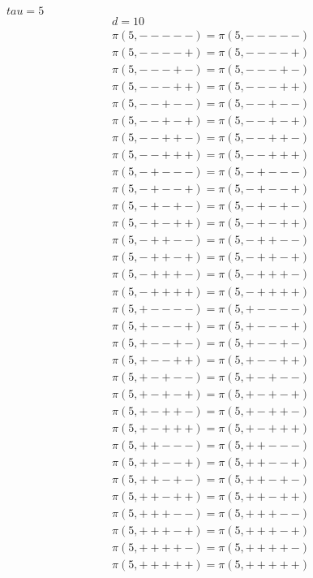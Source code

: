 \documentclass{article}
\begin{document}
	\pagebreak
			$ tau = 5$
		\begin{eqnarray*}
			d = 10\\
			\pi(5, -----) = \pi(5, -----)\\
			\pi(5, ----+) = \pi(5, ----+)\\
			\pi(5, ---+-) = \pi(5, ---+-)\\
			\pi(5, ---++) = \pi(5, ---++)\\
			\pi(5, --+--) = \pi(5, --+--)\\
			\pi(5, --+-+) = \pi(5, --+-+)\\
			\pi(5, --++-) = \pi(5, --++-)\\
			\pi(5, --+++) = \pi(5, --+++)\\
			\pi(5, -+---) = \pi(5, -+---)\\
			\pi(5, -+--+) = \pi(5, -+--+)\\
			\pi(5, -+-+-) = \pi(5, -+-+-)\\
			\pi(5, -+-++) = \pi(5, -+-++)\\
			\pi(5, -++--) = \pi(5, -++--)\\
			\pi(5, -++-+) = \pi(5, -++-+)\\
			\pi(5, -+++-) = \pi(5, -+++-)\\
			\pi(5, -++++) = \pi(5, -++++)\\
			\pi(5, +----) = \pi(5, +----)\\
			\pi(5, +---+) = \pi(5, +---+)\\
			\pi(5, +--+-) = \pi(5, +--+-)\\
			\pi(5, +--++) = \pi(5, +--++)\\
			\pi(5, +-+--) = \pi(5, +-+--)\\
			\pi(5, +-+-+) = \pi(5, +-+-+)\\
			\pi(5, +-++-) = \pi(5, +-++-)\\
			\pi(5, +-+++) = \pi(5, +-+++)\\
			\pi(5, ++---) = \pi(5, ++---)\\
			\pi(5, ++--+) = \pi(5, ++--+)\\
			\pi(5, ++-+-) = \pi(5, ++-+-)\\
			\pi(5, ++-++) = \pi(5, ++-++)\\
			\pi(5, +++--) = \pi(5, +++--)\\
			\pi(5, +++-+) = \pi(5, +++-+)\\
			\pi(5, ++++-) = \pi(5, ++++-)\\
			\pi(5, +++++) = \pi(5, +++++)\\

\end{eqnarray*}
\end{document}
